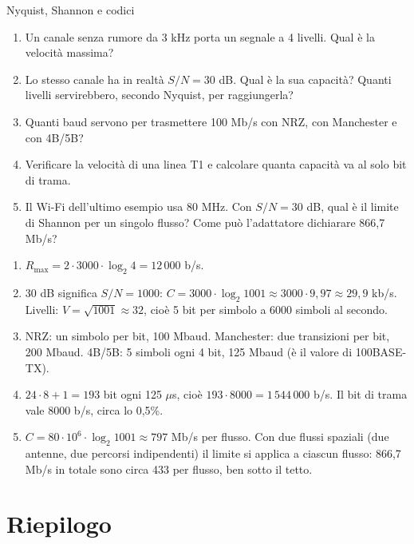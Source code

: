 \begin{esercizio}{Nyquist, Shannon e codici}
\begin{enumerate}[label=(\alph*)]
    \item Un canale senza rumore da 3 kHz porta un segnale a 4 livelli. Qual è la velocità massima?
    \item Lo stesso canale ha in realtà $S/N = 30$ dB. Qual è la sua capacità? Quanti livelli servirebbero, secondo Nyquist, per
          raggiungerla?
    \item Quanti baud servono per trasmettere 100 Mb/s con NRZ, con Manchester e con 4B/5B?
    \item Verificare la velocità di una linea T1 e calcolare quanta capacità va al solo bit di trama.
    \item Il Wi-Fi dell'ultimo esempio usa 80 MHz. Con $S/N = 30$ dB, qual è il limite di Shannon per un singolo flusso? Come può
          l'adattatore dichiarare 866,7 Mb/s?
\end{enumerate}

\svolgimento
\begin{enumerate}[label=(\alph*)]
    \item $R_{\max} = 2 \cdot 3000 \cdot \log_2 4 = 12\,000$ b/s.
    \item $30$ dB significa $S/N = 1000$: $C = 3000 \cdot \log_2 1001 \approx 3000 \cdot 9{,}97 \approx 29{,}9$ kb/s. Livelli:
          $V = \sqrt{1001} \approx 32$, cioè 5 bit per simbolo a 6000 simboli al secondo.
    \item NRZ: un simbolo per bit, 100 Mbaud. Manchester: due transizioni per bit, 200 Mbaud. 4B/5B: 5 simboli ogni 4 bit,
          125 Mbaud (è il valore di 100BASE-TX).
    \item $24 \cdot 8 + 1 = 193$ bit ogni 125 $\mu$s, cioè $193 \cdot 8000 = 1\,544\,000$ b/s. Il bit di trama vale $8000$ b/s,
          circa lo 0,5\%.
    \item $C = 80 \cdot 10^6 \cdot \log_2 1001 \approx 797$ Mb/s per flusso. Con due flussi spaziali (due antenne, due percorsi
          indipendenti) il limite si applica a ciascun flusso: 866,7 Mb/s in totale sono circa 433 per flusso, ben sotto il tetto.
\end{enumerate}
\end{esercizio}

\section{Riepilogo}

